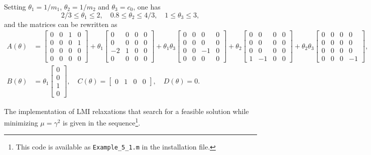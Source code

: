 \documentclass[english,11pt]{article}
\theoremstyle{break} \theorembodyfont{\small\rm}
\begin{document}
Setting $\theta_1 = 1/m_1$, $\theta_2 = 1/m_2$ and $\theta_3 = c_0$, one has
\[
 2/3 \leq \theta_1 \leq 2, \quad 0.8 \leq \theta_2 \leq 4/3, \quad 1 \leq \theta_3 \leq 3,
\]
and the matrices can be rewritten as
\begin{align*}
 A(\theta) & =
 \begin{bmatrix} 0 & 0 & 1 & 0 \\ 0 & 0 & 0 & 1 \\ 0 & 0 & 0 & 0 \\ 0 & 0 & 0 & 0 \end{bmatrix}
 + \theta_1 \begin{bmatrix} 0 & 0 & 0 & 0 \\ 0 & 0 & 0 & 0 \\ -2 & 1 & 0 & 0 \\ 0 & 0 & 0 & 0 \end{bmatrix}
 + \theta_1\theta_3 \begin{bmatrix} 0 & 0 & 0 & 0 \\ 0 & 0 & 0 & 0 \\ 0 & 0 & -1 & 0 \\ 0 & 0 & 0 & 0 \end{bmatrix}
 + \theta_2 \begin{bmatrix} 0 & 0 & 0 & 0 \\ 0 & 0 & 0 & 0 \\ 0 & 0 & 0 & 0 \\ 1 & -1 & 0 & 0 \end{bmatrix}
 + \theta_2\theta_3 \begin{bmatrix} 0 & 0 & 0 & 0 \\ 0 & 0 & 0 & 0 \\ 0 & 0 & 0 & 0 \\ 0 & 0 & 0 & -1 \end{bmatrix}, \\
 B(\theta) & = \theta_1 \begin{bmatrix} 0 \\ 0 \\ 1 \\ 0 \end{bmatrix}, \quad
 C(\theta) = \begin{bmatrix} 0 & 1 & 0 & 0 \end{bmatrix}, \quad D(\theta) = 0.
\end{align*}

The implementation of LMI relaxations that search for a feasible solution while 
minimizing $\mu = \gamma^2$ is given in the sequence\footnote{This code is available as {\tt Example\_5\_1.m} in the installation file.}.
\end{document}

